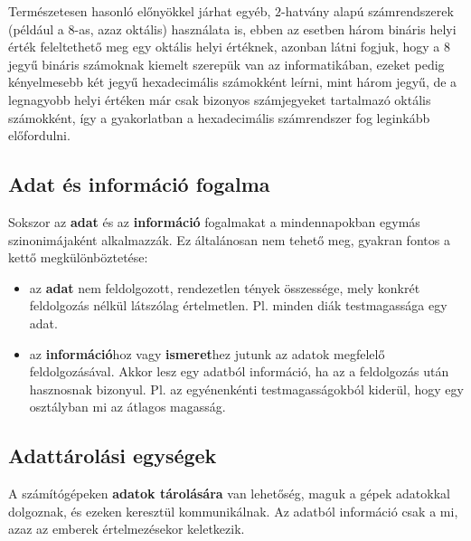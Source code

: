 Természetesen hasonló előnyökkel járhat egyéb, $2$-hatvány alapú számrendszerek (például a $8$-as, azaz oktális) használata is, ebben az esetben három bináris helyi érték feleltethető meg egy oktális helyi értéknek, azonban látni fogjuk, hogy a $8$ jegyű bináris számoknak kiemelt szerepük van az informatikában, ezeket pedig kényelmesebb két jegyű hexadecimális számokként leírni, mint három jegyű, de a legnagyobb helyi értéken már csak bizonyos számjegyeket tartalmazó oktális számokként, így a gyakorlatban a hexadecimális számrendszer fog leginkább előfordulni.

\subsection{Adat és információ fogalma}
Sokszor az \textbf{adat} és az \textbf{információ} fogalmakat a mindennapokban egymás szinonimájaként alkalmazzák. Ez általánosan nem tehető meg, gyakran fontos a kettő megkülönböztetése:
\begin{itemize}
  \item az \textbf{adat} nem feldolgozott, rendezetlen tények összessége, mely konkrét feldolgozás nélkül látszólag értelmetlen. Pl. minden diák testmagassága egy adat.
  \item az \textbf{információ}hoz vagy \textbf{ismeret}hez jutunk az adatok megfelelő feldolgozásával. Akkor lesz egy adatból információ, ha az a feldolgozás után hasznosnak bizonyul. Pl. az egyénenkénti testmagasságokból kiderül, hogy egy osztályban mi az átlagos magasság.
\end{itemize}

\subsection{Adattárolási egységek}
A számítógépeken \textbf{adatok tárolására} van lehetőség, maguk a gépek adatokkal dolgoznak, és ezeken keresztül kommunikálnak. Az adatból információ csak a mi, azaz az emberek értelmezésekor keletkezik.

